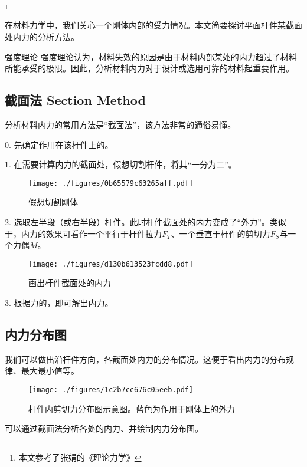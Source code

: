 
\footnote{本文参考了张娟的《理论力学》}

在材料力学中，我们关心一个刚体内部的受力情况。本文简要探讨平面杆件某截面处内力的分析方法。

\begin{example}{强度理论}
强度理论认为，材料失效的原因是由于材料内部某处的内力超过了材料所能承受的极限。因此，分析材料内力对于设计或选用可靠的材料起重要作用。
\end{example}

\subsection{截面法 Section Method}
分析材料内力的常用方法是“截面法”，该方法非常的通俗易懂。

0. 先确定作用在该杆件上的。

1. 在需要计算内力的截面处，假想切割杆件，将其“一分为二”。
\begin{figure}[ht]
\centering
\texttt{[image: ./figures/0b65579c63265aff.pdf]}
\caption{假想切割刚体} \label{fig_INTFRC_1}
\end{figure}

2. 选取左半段（或右半段）杆件。此时杆件截面处的内力变成了“外力”。类似于，内力的效果可看作一个平行于杆件拉力$F_T$、一个垂直于杆件的剪切力$F_S$与一个力偶$M$。
\begin{figure}[ht]
\centering
\texttt{[image: ./figures/d130b613523fcdd8.pdf]}
\caption{画出杆件截面处的内力} \label{fig_INTFRC_2}
\end{figure}

3. 根据力的，即可解出内力。

\subsection{内力分布图}
我们可以做出沿杆件方向，各截面处内力的分布情况。这便于看出内力的分布规律、最大最小值等。
\begin{figure}[ht]
\centering
\texttt{[image: ./figures/1c2b7cc676c05eeb.pdf]}
\caption{杆件内剪切力分布图示意图。蓝色为作用于刚体上的外力} \label{fig_INTFRC_3}
\end{figure}

可以通过截面法分析各处的内力、并绘制内力分布图。

